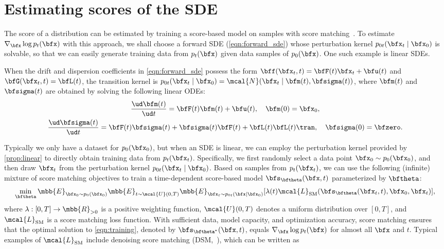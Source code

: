\section{Estimating scores of the SDE}
The score of a distribution can be estimated by training a score-based model on samples with score matching~\citep{hyvarinen2005estimation, song2019sliced, song2019generative}. To estimate $\nabla_\bfx \log p_t(\bfx)$ with this approach, we shall choose a forward SDE (\cref{eqn:forward_sde}) whose perturbation kernel $p_{0t}(\bfx_t \mid \bfx_0)$ is solvable, so that we can easily generate training data from $p_t(\bfx)$ given data samples of $p_0(\bfx)$. One such example is linear SDEs.
\begin{proposition}\label{prop:linear}
When the drift and dispersion coefficients in \cref{eqn:forward_sde} possess the form $\bff(\bfx_t, t) = \bfF(t)\bfx_t + \bfu(t)$ and $\bfG(\bfx_t, t) = \bfL(t)$, the transition kernel is $p_{0t}(\bfx_t \mid \bfx_0) = \mcal{N}(\bfx_t \mid \bfm(t), \bfsigma(t))$, where $\bfm(t)$ and $\bfsigma(t)$ are obtained by solving the following linear ODEs:
\begin{gather*}
\frac{\ud \bfm(t)}{\ud t} = \bfF(t)\bfm(t) + \bfu(t), \quad \bfm(0) = \bfx_0,\\
\frac{\ud \bfsigma(t)}{\ud t} = \bfF(t)\bfsigma(t) + \bfsigma(t)\bfF(t) + \bfL(t) \bfL(t)\tran, \quad \bfsigma(0) = \bfzero.
\end{gather*}
\end{proposition}
Typically we only have a dataset for $p_0(\bfx_0)$, but when an SDE is linear, we can employ the perturbation kernel provided by \cref{prop:linear} to directly obtain training data from $p_t(\bfx_t)$. Specifically, we first randomly select a data point $\bfx_0 \sim p_0(\bfx_0)$, and then draw $\bfx_t$ from the perturbation kernel $p_{0t}(\bfx_t \mid \bfx_0)$. Based on samples from $p_t(\bfx_t)$, we can use the following (infinite) mixture of score matching objectives to train a time-dependent score-based model $\bfs_\bftheta(\bfx, t)$ parameterized by $\bftheta$:
\begin{align}
    \min_\bftheta \mbb{E}_{\bfx_0 \sim p_0(\bfx_0)}\mbb{E}_{t\sim \mcal{U}(0, T)} \mbb{E}_{\bfx_t \sim p_{0t}(\bfx \mid \bfx_0)}[\lambda(t) \mcal{L}_{\text{SM}}(\bfs_\bftheta(\bfx_t, t), \bfx_0, \bfx_t)], \label{eqn:training}
\end{align}
where $\lambda: [0, T] \to \mbb{R}_{>0}$ is a positive weighting function, %
$\mcal{U}(0, T)$ denotes a uniform distribution over $[0, T]$, and $\mcal{L}_{\text{SM}}$ is a score matching loss function. With sufficient data, model capacity, and optimization accuracy, score matching ensures that the optimal solution to \cref{eqn:training}, denoted by $\bfs_{\bftheta^\ast}(\bfx, t)$, equals $\nabla_\bfx \log p_t(\bfx)$ for almost all $\bfx$ and $t$. Typical examples of $\mcal{L}_{\text{SM}}$ include denoising score matching (DSM,~\citet{vincent2011connection}), which can be written as 
